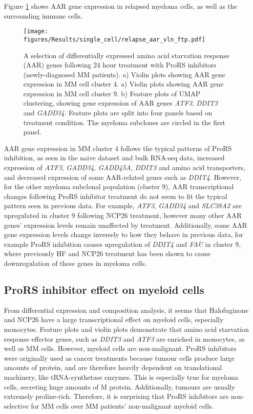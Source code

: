 Figure \ref{fig:relapse_aar_vln_ftp} shows AAR gene expression in relapsed myeloma cells, as well as the surrounding immune cells.
%
\begin{figure}[htb]
\centering
\texttt{[image: figures/Results/single\_cell/relapse\_aar\_vln\_ftp.pdf]}
\caption[scRNA-seq differentially expressed AAR genes- relapsed MM]{A selection of differentially expressed amino acid starvation response (AAR) genes following 24 hour treatment with ProRS inhibitors (newly-diagnosed MM patients).
    a) Violin plots showing AAR gene expression in MM cell cluster 4.
    a) Violin plots showing AAR gene expression in MM cell cluster 9.
    b) Feature plots of UMAP clustering, showing gene expression of AAR genes \textit{ATF3}, \textit{DDIT3} and \textit{GADD34}.
Feature plots are split into four panels based on treatment condition.
The myeloma subclones are circled in the first panel.
}
\label{fig:relapse_aar_vln_ftp}
\end{figure}
AAR gene expression in MM cluster 4 follows the typical patterns of ProRS inhibition, as seen in the naive dataset and bulk RNA-seq data, increased expression of \textit{ATF3}, \textit{GADD34}, \textit{GADD45A}, \textit{DDIT3} and amino acid transporters, and decreased expression of some AAR-related genes such as \textit{DDIT4}.
However, for the other myeloma subclonal population (cluster 9), AAR transcriptional changes following ProRS inhibitor treatment do not seem to fit the typical pattern seen in previous data.
For example, \textit{ATF3}, \textit{GADD34} and \textit{SLC38A2} are upregulated in cluster 9 following NCP26 treatment, however many other AAR genes' expression levels remain unaffected by treatment.
Additionally, some AAR gene expression levels change inversely to how they behave in previous data, for example ProRS inhibition causes upregulation of \textit{DDIT4} and \textit{FAU} in cluster 9, where previously HF and NCP26 treatment has been shown to cause downregulation of these genes in myeloma cells.


\subsection{ProRS inhibitor effect on myeloid cells}
From differential expression and composition analysis, it seems that Halofuginone and NCP26 have a large transcriptional effect on myeloid cells, especially monocytes.
Feature plots and violin plots demonstrate that amino acid starvation response effector genes, such as \textit{DDIT3} and \textit{ATF3} are enriched in monocytes, as well as MM cells.
However, myeloid cells are non-malignant.
ProRS inhibitors were originally used as cancer treatments because tumour cells produce large amounts of protein, and are therefore heavily dependent on translational machinery, like tRNA-synthetase enzymes.
This is especially true for myeloma cells, secreting huge amounts of M protein.
Additionally, tumours are usually extremely proline-rich.
Therefore, it is surprising that ProRS inhibitors are non-selective for MM cells over MM patients' non-malignant myeloid cells.

